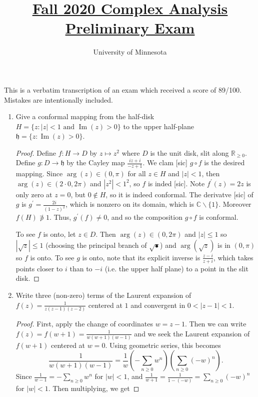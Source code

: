 \documentclass{article}
\title{\href{https://math.umn.edu/sites/math.umn.edu/files/exams/complexanalysis_fall2020.pdf}{Fall 2020 Complex Analysis Preliminary Exam}}
\author{University of Minnesota}
\date{}
\DeclareMathOperator{\Imag}{Im}
\begin{document}
\maketitle

This is a verbatim transcription of an exam which received a score of 89/100. Mistakes are intentionally included.

\begin{enumerate}

	\item	Give a conformal mapping from the half-disk $H = \{z: |z| < 1 \text{ and } \Imag(z)>0\}$ to the upper half-plane
	$\mathfrak{h} = \{ z : \Imag (z) > 0 \}$.
	
	\begin{proof}
		Define $f: H \rightarrow D$ by $z \mapsto z^2$ where $D$ is the unit disk, slit along $\mathbb{R}_{\geq 0}$.
		Define $g: D \rightarrow \mathfrak{h}$ by the Cayley map $\frac{iz + i}{-z+1}$.
		We clam [sic] $g \circ f$ is the desired mapping. Since $\arg (z) \in (0, \pi) $ for all $z \in H$ and $|z| < 1$, then
		$\arg(z) \in (2\cdot 0, 2\pi)$ and $|z^2| < 1^2$, so $f$ is inded [sic]. Note $f^\prime(z) = 2z$ is only zero at 
		$z=0$, but $0 \not \in H$, so it is indeed conformal.
		The derivatve [sic] of $g$ is $g^\prime = \frac{2i}{(1-z)^2}$, which is nonzero on its domain, 
		which is $\mathbb{C} \backslash \{1\}$. Moreover $f(H) \not \ni 1$.
		Thus, $g^\prime(f) \neq 0$, and so the composition $g \circ f$ is conformal.
		
		To see $f$ is onto, let $z \in D.$ Then $\arg(z) \in (0, 2\pi)$ and $|z| \leq 1$ so 
		$|\sqrt{z}| \leq 1$ (choosing the principal branch of $\sqrt{\bullet}$) and $\arg(\sqrt{z})$ is in $(0, \pi)$ so
		$f$ is onto. To see $g$ is onto, note that its explicit inverse is $\frac{z-i}{z+i}$, which takes points closer 
		to $i$ than to $-i$ (i.e. the upper half plane) to a point in the slit disk.
	\end{proof}
	
	\item Write three (non-zero) terms of the Laurent expansion of $f(z) = \frac{1}{z(z-1)(z-2)}$ centered at $1$ and convergent in 
	$0 < |z-1| < 1$.
	
	\begin{proof}
		First, apply the change of coordinates $w = z-1$. Then we can write $f(z) = f(w+1) = \frac{1}{w(w+1)(w-1)}$ 
		and we seek the Laurent expansion of $f(w+1)$ centered at $w=0$. Using geometric series, this becomes
		\[ \frac{1}{w(w+1)(w-1)} = \frac{1}{w} \left ( - \sum_{n \geq 0} w^n \right ) \left ( \sum_{n \geq 0} (-w)^n \right). \]
		Since $\frac{1}{w-1} = - \sum_{n \geq 0} w^n$ for $|w| < 1$, and 
		$\frac{1}{w+1} = \frac{1}{1-(-w)} = \sum_{n \geq 0} (-w)^n$ for $|w| < 1$. Then multiplying, we get
		

\end{proof}
\end{enumerate}
\end{document}
